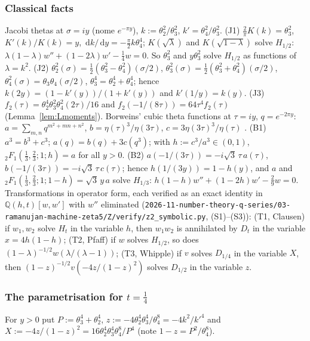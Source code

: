 \documentclass[11pt]{amsart}
\theoremstyle{definition}
\theoremstyle{remark}
\numberwithin{equation}{section}
\newcommand{\Q}{\mathbb{Q}}
\newcommand{\dd}{\,\mathrm{d}}
\newcommand{\file}[1]{\nolinkurl{2026-11-number-theory-q-series/03-ramanujan-machine-zeta5/#1}}
\begin{document}
\subsubsection{Classical facts}
Jacobi thetas at $\sigma=iy$ (nome $e^{-\pi y}$), $k:=\theta_2^2/\theta_3^2$, $k'=\theta_4^2/\theta_3^2$.
(J1) $\frac2\pi K(k)=\theta_3^2$, $K'(k)/K(k)=y$, $\dd k/\dd y=-\frac\pi2k\theta_4^4$; $K(\sqrt\lambda)$ and $K(\sqrt{1-\lambda})$ solve $H_{1/2}$: $\lambda(1-\lambda)w''+(1-2\lambda)w'-\frac14w=0$. So $\theta_3^2$ and $y\theta_3^2$ solve $H_{1/2}$ as functions of $\lambda=k^2$.
(J2) $\theta_2^2(\sigma)=\frac12(\theta_3^2-\theta_4^2)(\sigma/2)$, $\theta_3^2(\sigma)=\frac12(\theta_3^2+\theta_4^2)(\sigma/2)$, $\theta_4^2(\sigma)=\theta_3\theta_4(\sigma/2)$, $\theta_3^4=\theta_2^4+\theta_4^4$; hence $k(2y)=(1-k'(y))/(1+k'(y))$ and $k'(1/y)=k(y)$.
(J3) $f_2(\tau)=\theta_2^4\theta_3^2\theta_4^2(2\tau)/16$ and $f_2(-1/(8\tau))=64\tau^4f_2(\tau)$ (Lemma~\ref{lem:Lmoments}).
Borweins' cubic theta functions at $\tau=iy$, $q=e^{-2\pi y}$: $a=\sum_{m,n}q^{m^2+mn+n^2}$, $b=\eta(\tau)^3/\eta(3\tau)$, $c=3\eta(3\tau)^3/\eta(\tau)$ \cite{BBG,BBG2}.
(B1) $a^3=b^3+c^3$; $a(q)=b(q)+3c(q^3)$; with $h:=c^3/a^3\in(0,1)$, ${}_2F_1(\frac13,\frac23;1;h)=a$ for all $y>0$.
(B2) $a(-1/(3\tau))=-i\sqrt3\,\tau\,a(\tau)$, $b(-1/(3\tau))=-i\sqrt3\,\tau\,c(\tau)$; hence $h(1/(3y))=1-h(y)$, and $a$ and ${}_2F_1(\frac13,\frac23;1;1-h)=\sqrt3\,y\,a$ solve $H_{1/3}$: $h(1-h)w''+(1-2h)w'-\frac29w=0$.
Transformations in operator form, each verified as an exact identity in $\Q(h,t)[w,w']$ with $w''$ eliminated (\file{Z/verify/z2_symbolic.py}, (S1)--(S3)):
(T1, Clausen) if $w_1,w_2$ solve $H_t$ in the variable $h$, then $w_1w_2$ is annihilated by $D_t$ in the variable $x=4h(1-h)$;
(T2, Pfaff) if $w$ solves $H_{1/2}$, so does $(1-\lambda)^{-1/2}w(\lambda/(\lambda-1))$;
(T3, Whipple) if $v$ solves $D_{1/4}$ in the variable $X$, then $(1-z)^{-1/2}v(-4z/(1-z)^2)$ solves $D_{1/2}$ in the variable $z$.

\subsubsection{\texorpdfstring{The parametrisation for $t=\frac14$}{The parametrisation for t=1/4}}
For $y>0$ put $P:=\theta_3^4+\theta_2^4$, $z:=-4\theta_2^4\theta_3^4/\theta_4^8=-4k^2/k'^4$ and $X:=-4z/(1-z)^2=16\theta_2^4\theta_3^4\theta_4^8/P^4$ (note $1-z=P^2/\theta_4^8$).
\end{document}
